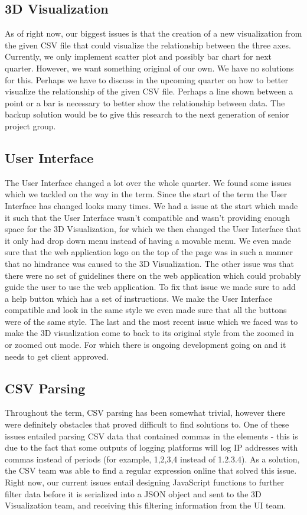 \documentclass[journal,10pt,onecolumn,compsoc]{IEEEtran} \usepackage[margin=1.0in]{geometry} \usepackage{pdfpages}
\begin{document}
 \subsection{3D Visualization}
 As of right now, our biggest issues is that the creation of a new visualization from the given CSV file that could visualize the relationship between the three axes. Currently, we only implement scatter plot and possibly bar chart for next quarter. However, we want something original of our own. We have no solutions for this. Perhaps we have to discuss in the upcoming quarter on how to better visualize the relationship of the given CSV file. Perhaps a line shown between a point or a bar is necessary to better show the relationship between data. The backup solution would be to give this research to the next generation of senior project group. 
 
 \subsection{User Interface}
 The User Interface changed a lot over the whole quarter. We found some issues which we tackled on the way in the term. Since the start of the term the User Interface has changed looks many times. We had a issue at the start which made it such that the User Interface wasn't compatible and wasn't providing enough space for the 3D Visualization, for which we then changed the User Interface that it only had drop down menu instead of having a movable  menu. We even made sure that the web application logo on the top of the page was in such a manner that no hindrance was caused to the 3D Visualization. The other issue was that there were no set of guidelines there on the web application which could probably guide the user to use the web application. To fix that issue we made sure to add a help button which has a set of instructions. We make the User Interface compatible and look in the same style we even made sure that all the buttons were of the same style. The last and the most recent issue which we faced was to make the 3D visualization come to back to its original style from the zoomed in or zoomed out mode. For which there is ongoing development going on and it needs to get client approved.
 
 \subsection{CSV Parsing}
 Throughout the term, CSV parsing has been somewhat trivial, however there were definitely obstacles that proved difficult to find solutions to. One of these issues entailed parsing CSV data that contained commas in the elements - this is due to the fact that some outputs of logging platforms will log IP addresses with commas instead of periods (for example, 1,2,3,4 instead of 1.2.3.4). As a solution, the CSV team was able to find a regular expression online that solved this issue. Right now, our current issues entail designing JavaScript functions to further filter data before it is serialized into a JSON object and sent to the 3D Visualization team, and receiving this filtering information from the UI team. 
 
\end{document}

